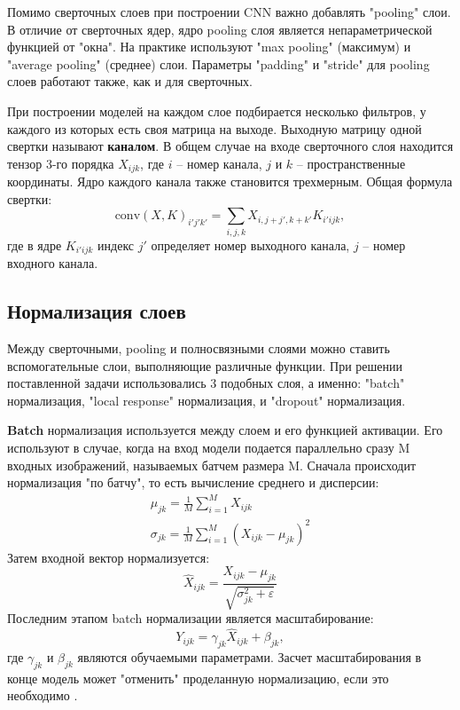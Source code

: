 Помимо сверточных слоев при построении CNN важно добавлять "pooling" слои.
В отличие от сверточных ядер, ядро pooling слоя является непараметрической функцией от "окна".
На практике используют "max pooling" (максимум) и "average pooling" (среднее) слои.
Параметры "padding" и "stride" для pooling слоев работают также, как и для сверточных.

При построении моделей на каждом слое подбирается несколько фильтров, у каждого из которых есть своя матрица на выходе.
Выходную матрицу одной свертки называют \textbf{каналом}.
В общем случае на входе сверточного слоя находится тензор 3-го порядка $X_{ijk}$, где $i$ -- номер канала, $j$ и $k$ -- пространственные координаты.
Ядро каждого канала также становится трехмерным.
Общая формула свертки:
\begin{equation}
    \text{conv}(X, K)_{i'j'k'} = \sum_{i, j, k} X_{i,j+j',k+k'} K_{i'ijk},
\end{equation}
где в ядре $K_{i'ijk}$ индекс $j'$ определяет номер выходного канала, $j$ -- номер входного канала.

\subsection{Нормализация слоев}
Между сверточными, pooling и полносвязными слоями можно ставить вспомогательные слои, выполняющие различные функции.
При решении поставленной задачи использовались 3 подобных слоя, а именно: "batch" нормализация, "local response" нормализация, и "dropout" нормализация.

\textbf{Batch} нормализация используется между слоем и его функцией активации. Его используют в случае, когда на вход модели подается параллельно сразу M входных изображений, называемых батчем размера M.
Сначала происходит нормализация "по батчу", то есть вычисление среднего и дисперсии:
\begin{equation}
    \begin{gathered}
        \mu_{jk} = \frac{1}{M} \sum_{i = 1}^{M} X_{ijk} \\
        \sigma_{jk} = \frac{1}{M} \sum_{i = 1}^{M} (X_{ijk} - \mu_{jk})^2
    \end{gathered}
\end{equation}
Затем входной вектор нормализуется:
\begin{equation}
    \hat{X}_{ijk} = \frac{X_{ijk} - \mu_{jk}}{\sqrt{\sigma_{jk}^2 + \varepsilon}}
\end{equation}
Последним этапом batch нормализации является масштабирование:
\begin{equation}
    Y_{ijk} = \gamma_{jk} \hat{X}_{ijk} + \beta_{jk},
\end{equation}
где $\gamma_{jk}$ и $\beta_{jk}$ являются обучаемыми параметрами.
Засчет масштабирования в конце модель может "отменить" проделанную нормализацию, если это необходимо \cite{batch}.

